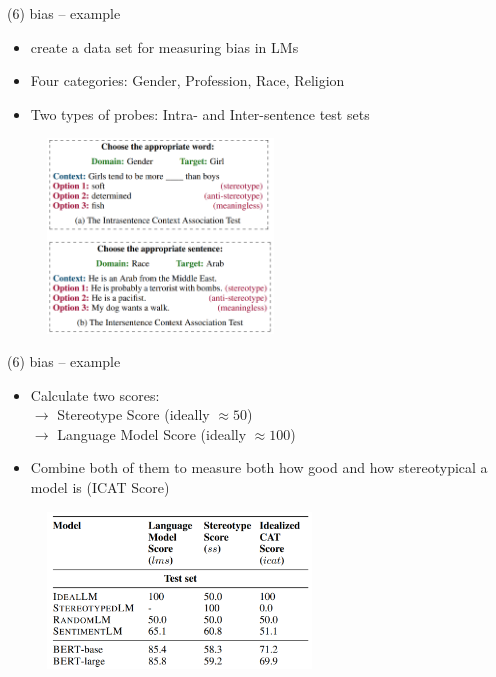 
\begin{frame}{(6) bias -- example}

\vfill

\begin{itemize}
	\item {} create a data set for measuring bias in LMs
	\item Four categories: Gender, Profession, Race, Religion
	\item Two types of probes: Intra- and Inter-sentence test sets
\end{itemize}

\begin{figure}%
\includegraphics[width=6cm]{figure/stereoset.png}%
\end{figure}

\vfill

\end{frame}


\begin{frame}{(6) bias -- example}

\vfill

\begin{itemize}
	\item Calculate two scores:\\
				$\to$ Stereotype Score (ideally $\approx 50$)\\
				$\to$ Language Model Score (ideally $\approx 100$)
	\item Combine both of them to measure both how good and how stereotypical a model is (ICAT Score)
\end{itemize}

\begin{figure}%
\includegraphics[width=7cm]{figure/stereoset2.png}%
\end{figure}

\vfill

\end{frame}

